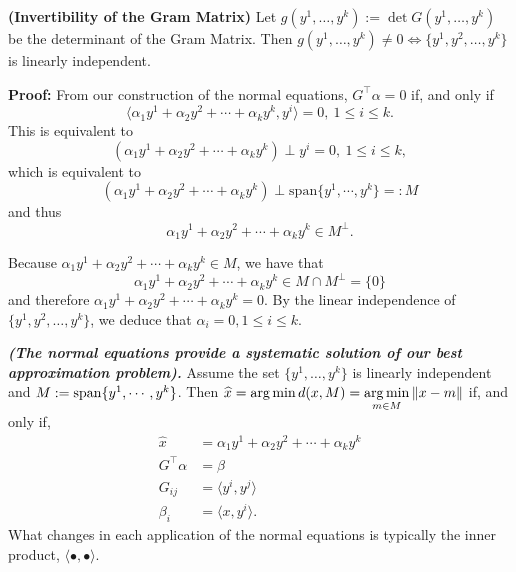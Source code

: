 \begin{prop} \textbf{(Invertibility of the Gram Matrix)}
\label{prop:GramInvertible}
Let $g(y^1,\ldots,y^k):=\det G(y^1,\ldots,y^k)$ be the determinant of the Gram Matrix. Then $g(y^1,\ldots,y^k) \neq 0 \iff \{ y^1, y^2, \ldots, y^k \}$ is linearly independent.
\end{prop} 

\textbf{Proof:} From our construction of the normal equations,  $G^\top \alpha = 0$ if, and only if
$$  \langle \alpha_1 y^1+ \alpha_2 y^2+\cdots +\alpha_k y^k, y^i \rangle  = 0, ~ 1 \le i \le k.$$
This is equivalent to
$$  \left( \alpha_1 y^1+ \alpha_2 y^2+ \cdots +\alpha_k y^k \right) \perp  y^i = 0,  ~ 1 \le i \le k,$$
which is equivalent to
$$  \left( \alpha_1 y^1+ \alpha_2 y^2+ \cdots + \alpha_k y^k \right) \perp  \textrm{span} \{ y^1, \cdots, y^k \}=:M $$
and thus
$$ \alpha_1 y^1+ \alpha_2 y^2+ \cdots + \alpha_k y^k  \in M^\perp.$$

Because $\alpha_1 y^1+ \alpha_2 y^2+\cdots +\alpha_k y^k \in M$, we have that
$$ \alpha_1 y^1+ \alpha_2 y^2+\cdots +\alpha_k y^k  \in M \cap M^\perp  =\{ 0 \}$$
and therefore
$ \alpha_1 y^1+ \alpha_2 y^2+\cdots +\alpha_k y^k  = 0.$ By the linear independence of
$\{ y^1, y^2, \ldots, y^k \}$, we deduce that $\alpha_i = 0, 1 \le i \le k$. 

\Qed

\begin{summary} \textbf{\emph{(The normal equations provide a systematic solution of our best approximation problem).}} Assume the set $\{ y^1,\ldots, y^k \}$ is linearly independent and $M:=\mathrm{span} \{ y^1,\cdots, y^k  \}$. Then
$\widehat{x} = \operatorname*{arg\,min} d(x,M) =\operatorname*{arg\,min} \limits_{m \in M} \|x - m\|$ if, and only if,
\begin{equation}
\begin{aligned}
\widehat{x} &= \alpha_1 y^1+ \alpha_2 y^2+ \cdots +\alpha_k y^k \\
G^\top \alpha &=\beta \\
G_{ij}&= \langle y^i,y^j \rangle \\
\beta_i &= \langle x,y^i \rangle.
\end{aligned} 
\end{equation}
What changes in each application of the normal equations is typically the inner product, $\langle \bullet , \bullet \rangle$. 
\end{summary}




